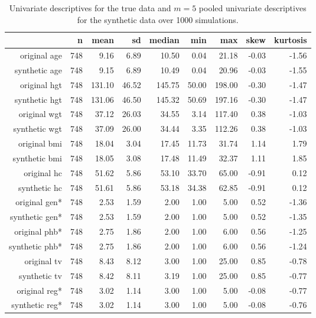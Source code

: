 \documentclass[psych,article,submit,moreauthors,pdftex]{mdpi}
\begin{document}
\begin{table}[ht]
\caption{Univariate descriptives for the true data and $m=5$ pooled univariate descriptives for the synthetic data over 1000 simulations.}
\centering
\begin{tabular}{rrrrrrrrr}
  \hline
 & n & mean & sd & median & min & max & skew & kurtosis \\ 
  \hline
original age & 748 & 9.16 & 6.89 & 10.50 & 0.04 & 21.18 & -0.03 & -1.56 \\ 
  synthetic age & 748 & 9.15 & 6.89 & 10.49 & 0.04 & 20.96 & -0.03 & -1.55 \\ 
  original hgt & 748 & 131.10 & 46.52 & 145.75 & 50.00 & 198.00 & -0.30 & -1.47 \\ 
  synthetic hgt & 748 & 131.06 & 46.50 & 145.32 & 50.69 & 197.16 & -0.30 & -1.47 \\ 
  original wgt & 748 & 37.12 & 26.03 & 34.55 & 3.14 & 117.40 & 0.38 & -1.03 \\ 
  synthetic wgt & 748 & 37.09 & 26.00 & 34.44 & 3.35 & 112.26 & 0.38 & -1.03 \\ 
  original bmi & 748 & 18.04 & 3.04 & 17.45 & 11.73 & 31.74 & 1.14 & 1.79 \\ 
  synthetic bmi & 748 & 18.05 & 3.08 & 17.48 & 11.49 & 32.37 & 1.11 & 1.85 \\ 
  original hc & 748 & 51.62 & 5.86 & 53.10 & 33.70 & 65.00 & -0.91 & 0.12 \\ 
  synthetic hc & 748 & 51.61 & 5.86 & 53.18 & 34.38 & 62.85 & -0.91 & 0.12 \\ 
  original gen* & 748 & 2.53 & 1.59 & 2.00 & 1.00 & 5.00 & 0.52 & -1.36 \\ 
  synthetic gen* & 748 & 2.53 & 1.59 & 2.00 & 1.00 & 5.00 & 0.52 & -1.35 \\ 
  original phb* & 748 & 2.75 & 1.86 & 2.00 & 1.00 & 6.00 & 0.56 & -1.25 \\ 
  synthetic phb* & 748 & 2.75 & 1.86 & 2.00 & 1.00 & 6.00 & 0.56 & -1.24 \\ 
  original tv & 748 & 8.43 & 8.12 & 3.00 & 1.00 & 25.00 & 0.85 & -0.78 \\ 
  synthetic tv & 748 & 8.42 & 8.11 & 3.19 & 1.00 & 25.00 & 0.85 & -0.77 \\ 
  original reg* & 748 & 3.02 & 1.14 & 3.00 & 1.00 & 5.00 & -0.08 & -0.77 \\ 
  synthetic reg* & 748 & 3.02 & 1.14 & 3.00 & 1.00 & 5.00 & -0.08 & -0.76 \\ 
   \hline
\end{tabular}
\end{table}
\end{document}
